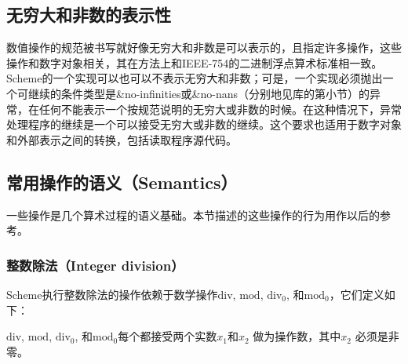 \subsection{无穷大和非数的表示性}
\label{infinitiesnanssection}

数值操作的规范被书写就好像无穷大和非数是可以表示的，且指定许多操作，这些操作和数字对象相关，其在方法上和IEEE-754的二进制浮点算术标准相一致。Scheme的一个实现可以也可以不表示无穷大和非数；可是，一个实现必须抛出一个可继续的条件类型是{\cf\&no-infinities}或{\cf\&no-nans}（分别地见库的第小节）的异常，在任何不能表示一个按规范说明的无穷大或非数的时候。在这种情况下，异常处理程序的继续是一个可以接受无穷大或非数的继续。这个要求也适用于数字对象和外部表示之间的转换，包括读取程序源代码。

\subsection{常用操作的语义（Semantics）}

一些操作是几个算术过程的语义基础。本节描述的这些操作的行为用作以后的参考。

\subsubsection{整数除法（Integer division）}
\label{integerdivision}

Scheme执行整数除法的操作依赖于数学操作$\mathrm{div}$, $\mathrm{mod}$, $\mathrm{div}_0$, 和$\mathrm{mod}_0$，它们定义如下：

$\mathrm{div}$, $\mathrm{mod}$, $\mathrm{div}_0$, 和$\mathrm{mod}_0$每个都接受两个实数$x_1$和$x_2$ 做为操作数，其中$x_2$ 必须是非零。

